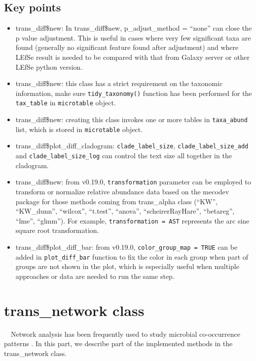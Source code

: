 \documentclass[
]{book}
\newcounter{none} %
\providecommand{\tightlist}{%
  \setlength{\itemsep}{0pt}\setlength{\parskip}{0pt}}
\begin{document}
\subsection{Key points}\label{key-points-6}

\begin{itemize}
\tightlist
\item
  trans\_diff\$new: In trans\_diff\$new, p\_adjust\_method = ``none'' can close the p value adjustment.
  This is useful in cases where very few significant taxa are found (generally no significant feature found after adjustment) and
  where LEfSe result is needed to be compared with that from Galaxy server or other LEfSe python version.
\item
  trans\_diff\$new: this class has a strict requirement on the taxonomic information,
  make sure \texttt{tidy\_taxonomy()} function has been performed for the \texttt{tax\_table} in \texttt{microtable} object.
\item
  trans\_diff\$new: creating this class invokes one or more tables in \texttt{taxa\_abund} list, which is stored in \texttt{microtable} object.
\item
  trans\_diff\$plot\_diff\_cladogram: \texttt{clade\_label\_size}, \texttt{clade\_label\_size\_add} and \texttt{clade\_label\_size\_log} can control the text size all together in the cladogram.
\item
  trans\_diff\$new: from v0.19.0, \texttt{transformation} parameter can be employed to transform or normalize relative abundance data based on the mecodev package for
  those methods coming from trans\_alpha class (``KW'', ``KW\_dunn'', ``wilcox'', ``t.test'', ``anova'', ``scheirerRayHare'', ``betareg'', ``lme'', ``glmm'').
  For example, \texttt{transformation\ =\ \textquotesingle{}AST\textquotesingle{}} represents the arc sine square root transformation.
\item
  trans\_diff\$plot\_diff\_bar: from v0.19.0, \texttt{color\_group\_map\ =\ TRUE} can be added in \texttt{plot\_diff\_bar} function to
  fix the color in each group when part of groups are not shown in the plot, which is especially useful when multiple approaches or data are needed to run the same step.
\end{itemize}

\section{trans\_network class}\label{trans_network-class}

　Network analysis has been frequently used to study microbial co-occurrence patterns \citep{Deng_Molecular_2012, Faust_Microbial_2012, Coyte_Theecology_2015}.
In this part, we describe part of the implemented methods in the trans\_network class.
\end{document}
